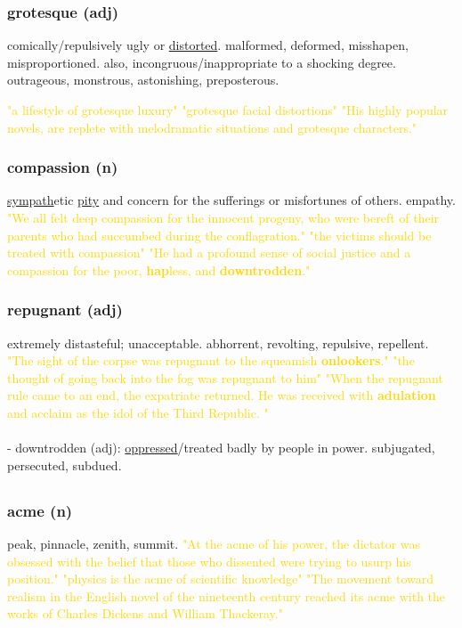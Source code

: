\documentclass{proc}
\begin{document}
	\subsubsection{\textcolor{brickred}{grotesque} (adj)}
	comically/repulsively ugly or \underline{distorted}.
	malformed,
	deformed,
	misshapen,
	misproportioned. also, incongruous/inappropriate to a shocking degree. 
	outrageous,
	monstrous,
	astonishing,
	preposterous.
	
	\textcolor{gold}{"a lifestyle of grotesque luxury" "grotesque facial distortions" "His highly popular novels, are replete with melodramatic situations and grotesque characters."}
	
	\subsubsection{\textcolor{brickred}{compassion} (n)}
	\underline{sympath}etic \underline{pity} and concern for the sufferings or misfortunes of others. empathy.
	\textcolor{gold}{"We all felt deep compassion for the innocent progeny, who were bereft of their 
		parents who had succumbed during the conflagration." "the victims should be treated with compassion" "He had a 
		profound sense of social justice and a compassion for the poor, 
		\textbf{hap}less, and \textbf{downtrodden}."}
	
	\subsubsection{\textcolor{brickred}{repugnant} (adj)}
	extremely distasteful; unacceptable. 
	abhorrent,
	revolting,
	repulsive,
	repellent.
	\textcolor{gold}{"The sight of the corpse was repugnant to the squeamish \textbf{onlookers}." "the thought of going back into the fog was repugnant to him" "When the repugnant 
		rule came to an end, the expatriate returned. He was received 
		with \textbf{adulation} and acclaim as the idol of the Third Republic. "}\\\\
	- downtrodden (adj): \underline{oppressed}/treated badly by people in power. 
	subjugated, persecuted, subdued.
 	
	\newpage
	\subsection{}
	\subsubsection{\textcolor{brickred}{acme} (n)}
	peak,
	pinnacle,
	zenith,
	summit.
	\textcolor{gold}{"At the acme of his power, the dictator was obsessed with the belief that 
		those who dissented were trying to usurp his position." "physics is the acme of scientific knowledge" "The movement toward realism in the English novel of the 
		nineteenth century reached its acme with the works of 
		Charles Dickens and William Thackeray."}
	
\end{document}
